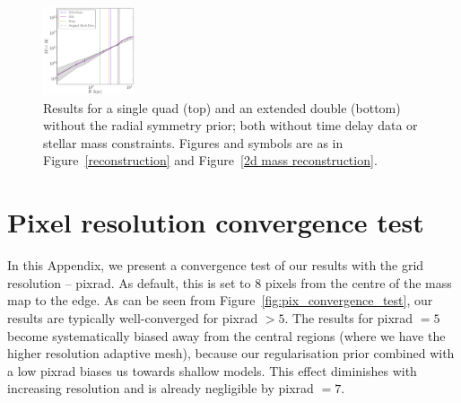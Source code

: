 \documentclass[galley,usenatbib]{mn2e}
\newcommand{\figref}[1] {Figure~\ref{#1}}
\begin{document}
\begin{figure}
\includegraphics[width=0.24\textwidth]{BCExtendedDoubleR1-nosymm_tms-c.pdf}
\caption{Results for a single quad (top) and an extended double (bottom) without the radial symmetry prior; both without time delay data or stellar mass constraints. Figures and symbols are as in \figref{reconstruction} and \figref{2d mass reconstruction}.}
\label{fig:no_symm_prior}
\end{figure}

\section{Pixel resolution convergence test}\label{pix_convergence_test}

In this Appendix, we present a convergence test of our results with the grid resolution -- pixrad. As default, this is set to 8 pixels from the centre of the mass map to the edge. As can be seen from \figref{fig:pix_convergence_test}, our results are typically well-converged for pixrad$\,\,> 5$. The results for pixrad$\,\,= 5$ become systematically biased away from the central regions (where we have the higher resolution adaptive mesh), because our regularisation prior combined with a low pixrad biases us towards shallow models. This effect diminishes with increasing resolution and is already negligible by pixrad$\,\,= 7$.
\end{document}
